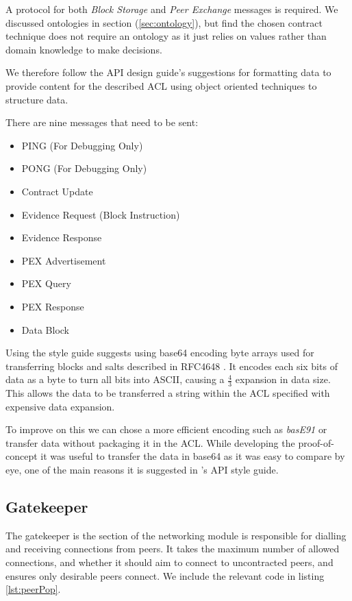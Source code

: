 \documentclass[11pt, a4paper, twoside]{report}
\begin{document}
A protocol for both \emph{Block Storage} and \emph{Peer Exchange} messages is required. We discussed ontologies in section (\ref{sec:ontology}), but find the chosen contract technique does not require an ontology as it just relies on values rather than domain knowledge to make decisions.

We therefore follow the API design guide's suggestions for formatting data to provide content for the described ACL using object oriented techniques to structure data.

There are nine messages that need to be sent:

\begin{itemize}
 \item PING (For Debugging Only)
 \item PONG (For Debugging Only)
 \item Contract Update
 \item Evidence Request (Block Instruction)
 \item Evidence Response
 \item PEX Advertisement
 \item PEX Query
 \item PEX Response
 \item Data Block
\end{itemize}

Using the style guide suggests using base64 encoding byte arrays used for transferring blocks and salts described in RFC4648 \citep{josefsson2006base16}. It encodes each six bits of data as a byte to turn all bits into ASCII, causing a $\frac{4}{3}$ expansion in data size. This allows the data to be transferred a string within the ACL specified with expensive data expansion.

To improve on this we can chose a more efficient encoding such as \emph{basE91} \citep{joachim2015base91} or transfer data without packaging it in the ACL. While developing the proof-of-concept it was useful to transfer the data in base64 as it was easy to compare by eye, one of the main reasons it is suggested in \cite{google2017api}'s API style guide.

\subsection{Gatekeeper}

The gatekeeper is the section of the networking module is responsible for dialling and receiving connections from peers. It takes the maximum number of allowed connections, and whether it should aim to connect to uncontracted peers, and ensures only desirable peers connect. We include the relevant code in listing \ref{lst:peerPop}.
\end{document}
